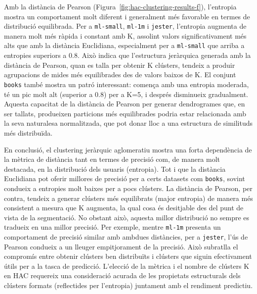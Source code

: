 \documentclass[a4paper,12pt]{report}
\begin{document}
Amb la distància de Pearson (Figura~\ref{fig:hac-clustering-results-f}), l'entropia mostra un comportament molt diferent i generalment més favorable en termes de distribució equilibrada. Per a \texttt{ml-small}, \texttt{ml-1m} i \texttt{jester}, l'entropia augmenta de manera molt més ràpida i constant amb K, assolint valors significativament més alts que amb la distància Euclidiana, especialment per a \texttt{ml-small} que arriba a entropies superiors a 0.8. Això indica que l'estructura jeràrquica generada amb la distància de Pearson, quan es talla per obtenir K clústers, tendeix a produir agrupacions de mides més equilibrades des de valors baixos de K. El conjunt \texttt{books} també mostra un patró interessant: comença amb una entropia moderada, té un pic molt alt (superior a 0.8) per a K=5, i després disminueix gradualment. Aquesta capacitat de la distància de Pearson per generar dendrogrames que, en ser tallats, produeixen particions més equilibrades podria estar relacionada amb la seva naturalesa normalitzada, que pot donar lloc a una estructura de similituds més distribuïda.

En conclusió, el clustering jeràrquic aglomeratiu mostra una forta dependència de la mètrica de distància tant en termes de precisió com, de manera molt destacada, en la distribució dels usuaris (entropia). Tot i que la distància Euclidiana pot oferir millores de precisió per a certs datasets com \texttt{books}, sovint condueix a entropies molt baixes per a pocs clústers. La distància de Pearson, per contra, tendeix a generar clústers més equilibrats (major entropia) de manera més consistent a mesura que K augmenta, la qual cosa és desitjable des del punt de vista de la segmentació. No obstant això, aquesta millor distribució no sempre es tradueix en una millor precisió. Per exemple, mentre \texttt{ml-1m} presenta un comportament de precisió similar amb ambdues distàncies, per a \texttt{jester}, l'ús de Pearson condueix a un lleuger empitjorament de la precisió. Això subratlla el compromís entre obtenir clústers ben distribuïts i clústers que siguin efectivament útils per a la tasca de predicció. L'elecció de la mètrica i el nombre de clústers K en HAC requereix una consideració acurada de les propietats estructurals dels clústers formats (reflectides per l'entropia) juntament amb el rendiment predictiu.
\end{document}
